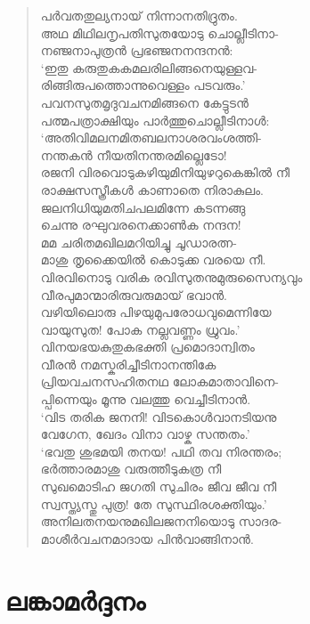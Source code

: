\begin{verse}
പര്‍വതതുല്യനായ് നിന്നാനതിദ്രുതം.\\
അഥ മിഥിലനൃപതിസുതയോടു ചൊല്ലീടിനാ-\\
നഞ്ജനാപുത്രന്‍ പ്രഭഞ്ജനനന്ദനന്‍:\\
‘ഇതു കരുതുകകമലരിലിങ്ങനെയുള്ളവ-\\
രിങ്ങിരുപത്തൊന്നുവെള്ളം പടവരും.’\\
പവനസുതമൃദുവചനമിങ്ങനെ കേട്ടുടന്‍\\
പത്മപത്രാക്ഷിയും പാര്‍ത്തുചൊല്ലീടിനാള്‍:\\
‘അതിവിമലനമിതബലനാശരവംശത്തി-\\
നന്തകന്‍ നീയതിനന്തരമില്ലെടോ!\\
രജനി വിരവൊടുകഴിയുമിനിയുഴറുകെങ്കില്‍ നീ\\
രാക്ഷസസ്ത്രീകള്‍ കാണാതെ നിരാകുലം.\\
ജലനിധിയുമതിചപലമിന്നേ കടന്നങ്ങു\\
ചെന്നു രഘുവരനെക്കാണ്‍ക നന്ദന!\\
മമ ചരിതമഖിലമറിയിച്ചു ചൂഡാരത്ന-\\
മാശു തൃക്കൈയില്‍ കൊടുക്ക വരയെ നീ.\\
വിരവിനൊടു വരിക രവിസുതനുമുരുസൈന്യവും\\
വീരപുമാന്മാരിരുവരുമായ് ഭവാന്‍.\\
വഴിയിലൊരു പിഴയുമുപരോധവുമെന്നിയേ\\
വായുസുത! പോക നല്ലവണ്ണം ധ്രുവം.’\\
വിനയഭയകുതുകഭക്തി പ്രമൊദാന്വിതം\\
വീരന്‍ നമസ്കരിച്ചീടിനാനന്തികേ\\
പ്രിയവചനസഹിതനഥ ലോകമാതാവിനെ-\\
പ്പിന്നെയും മൂന്നു വലത്തു വെച്ചീടിനാന്‍.\\
‘വിട തരിക ജനനി! വിടകൊള്‍വാനടിയനു\\
വേഗേന, ഖേദം വിനാ വാഴ്ക സന്തതം.’\\
‘ഭവതു ശുഭമയി തനയ! പഥി തവ നിരന്തരം;\\
ഭര്‍ത്താരമാശു വരുത്തീടുകത്ര നീ\\
സുഖമൊടിഹ ജഗതി സുചിരം ജീവ ജീവ നീ\\
സ്വസ്ത്യസ്തു പുത്ര! തേ സുസ്ഥിരശക്തിയും.’\\
അനിലതനയനുമഖിലജനനിയൊടു സാദര-\\
മാശീര്‍വചനമാദായ പിന്‍വാങ്ങിനാന്‍.
\end{verse}


\section{ലങ്കാമര്‍ദ്ദനം}

